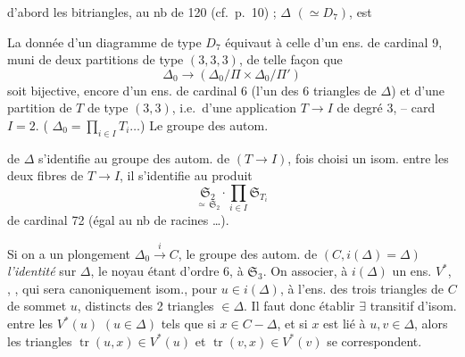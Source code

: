 \documentclass[11pt,a4paper]{article}
\begin{document}

 d'abord les bitriangles, au nb de 120 (cf.\ p.~10) ;
 $\Delta$ $(\simeq D_7)$, est

La donnée d'un diagramme de type $D_7$
\add{\uncertain{$(\Delta)$}} équivaut à celle
d'un ens.  de cardinal 9, muni de  deux partitions de type $(3, 3, 3)$, de
telle façon que 
\[
\Delta_0 \longrightarrow (\Delta_0 / \Pi \times \Delta_0 / \Pi')
\]
soit bijective,  encore d'un ens.  de cardinal 6
(l'un des 6 triangles de $\Delta$) et d'une partition de $T$ de type
$(3, 3)$, i.e.\ d'une application $T \to I$ de degré 3, --
\struck{\ill{}} card $I = 2$. ( 
$\Delta_0 = \prod_{i \in I} T_i \ldots$) Le groupe des autom.


de $\Delta$  s'identifie au groupe des autom. de
$(T \to I)$,  fois choisi un isom. entre les deux fibres de
$T \to I$, il s'identifie au produit 
\[
\underset{\simeq\, \mathfrak{S}_2}{\mathfrak{S}_2} \cdot \prod_{i \in I} \mathfrak{S}_{T_i}
\]
de cardinal 72 (égal au nb de racines \ldots).

Si on a un plongement $\Delta_0 \xrightarrow{\ i\ } C$, le groupe des
\struck{\ill{}} autom. de $(C, i(\Delta) = \Delta)$ 
\emph{l'identité} sur $\Delta$, le noyau étant d'ordre 6, 
à $\mathfrak{S}_3$. On  associer, à $i(\Delta)$ un ens.
$V^{*}$, , \ill{}, qui sera canoniquement isom., pour
$u \in i(\Delta)$, à \struck{\ill{}} l'ens.  des trois
triangles de $C$ de sommet $u$, distincts des 2 triangles $\in \Delta$.
Il faut donc établir \emph{\ill{}} $\exists$  transitif
d'isom. entre les $V^{*}(u)$ $(u \in \Delta)$ tels que si
$x \in C - \Delta$, et si $x$ est lié à $u, v \in \Delta$, alors les
triangles $\operatorname{tr}(u, x) \in V^{*}(u)$ et
$\operatorname{tr}(v, x) \in V^{*}(v)$ se correspondent.
\end{document}
